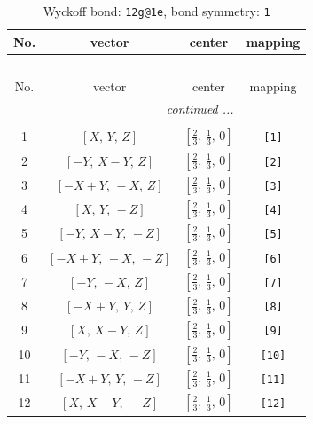 \documentclass[fleqn,8pt]{jsarticle}
\begin{document}
\begin{longtable}{cccc}
\caption{Wyckoff bond: {\tt 12g@1e}, bond symmetry: {\tt 1}}
 \\
 \hline \hline
No. & vector & center & mapping \\ \hline \endfirsthead

\multicolumn{3}{l}{\tablename\ \thetable{}} \\
 \hline \hline
No. & vector & center & mapping \\ \hline \endhead

 \hline \hline
\multicolumn{3}{r}{\footnotesize\it continued ...} \\ \endfoot

 \hline \hline
\multicolumn{3}{r}{} \\ \endlastfoot

1 & $\left[ X,\, Y,\, Z \right]$ & $\left[ \frac{2}{3},\, \frac{1}{3},\, 0 \right]$ & {\tt [1]} \\ \hline
2 & $\left[ - Y,\, X - Y,\, Z \right]$ & $\left[ \frac{2}{3},\, \frac{1}{3},\, 0 \right]$ & {\tt [2]} \\ \hline
3 & $\left[ - X + Y,\, - X,\, Z \right]$ & $\left[ \frac{2}{3},\, \frac{1}{3},\, 0 \right]$ & {\tt [3]} \\ \hline
4 & $\left[ X,\, Y,\, - Z \right]$ & $\left[ \frac{2}{3},\, \frac{1}{3},\, 0 \right]$ & {\tt [4]} \\ \hline
5 & $\left[ - Y,\, X - Y,\, - Z \right]$ & $\left[ \frac{2}{3},\, \frac{1}{3},\, 0 \right]$ & {\tt [5]} \\ \hline
6 & $\left[ - X + Y,\, - X,\, - Z \right]$ & $\left[ \frac{2}{3},\, \frac{1}{3},\, 0 \right]$ & {\tt [6]} \\ \hline
7 & $\left[ - Y,\, - X,\, Z \right]$ & $\left[ \frac{2}{3},\, \frac{1}{3},\, 0 \right]$ & {\tt [7]} \\ \hline
8 & $\left[ - X + Y,\, Y,\, Z \right]$ & $\left[ \frac{2}{3},\, \frac{1}{3},\, 0 \right]$ & {\tt [8]} \\ \hline
9 & $\left[ X,\, X - Y,\, Z \right]$ & $\left[ \frac{2}{3},\, \frac{1}{3},\, 0 \right]$ & {\tt [9]} \\ \hline
10 & $\left[ - Y,\, - X,\, - Z \right]$ & $\left[ \frac{2}{3},\, \frac{1}{3},\, 0 \right]$ & {\tt [10]} \\ \hline
11 & $\left[ - X + Y,\, Y,\, - Z \right]$ & $\left[ \frac{2}{3},\, \frac{1}{3},\, 0 \right]$ & {\tt [11]} \\ \hline
12 & $\left[ X,\, X - Y,\, - Z \right]$ & $\left[ \frac{2}{3},\, \frac{1}{3},\, 0 \right]$ & {\tt [12]} \\
\end{longtable}
\end{document}
